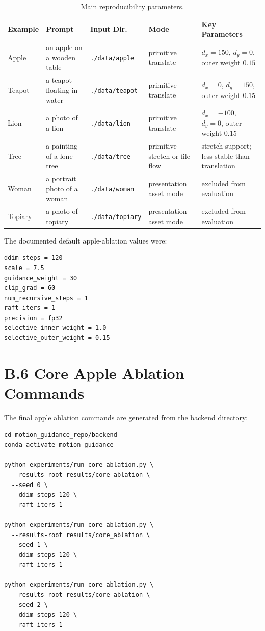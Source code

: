 \begin{table}[p]
  \centering
  \scriptsize
  \caption{Main reproducibility parameters.}
  \label{tab:appendix-repro-params}
  \renewcommand{\arraystretch}{1.15}
  \begin{tabular}{p{0.75in}|p{1.05in}|p{1.0in}|p{1.0in}|p{1.45in}}
    \hline
    \textbf{Example} & \textbf{Prompt} & \textbf{Input Dir.} & \textbf{Mode} & \textbf{Key Parameters} \\ \hline \hline
    Apple & an apple on a wooden table & \texttt{./data/apple} & primitive translate & $d_x=150$, $d_y=0$, outer weight $0.15$ \\ \hline
    Teapot & a teapot floating in water & \texttt{./data/teapot} & primitive translate & $d_x=0$, $d_y=150$, outer weight $0.15$ \\ \hline
    Lion & a photo of a lion & \texttt{./data/lion} & primitive translate & $d_x=-100$, $d_y=0$, outer weight $0.15$ \\ \hline
    Tree & a painting of a lone tree & \texttt{./data/tree} & primitive stretch or file flow & stretch support; less stable than translation \\ \hline
    Woman & a portrait photo of a woman & \texttt{./data/woman} & presentation asset mode & excluded from evaluation \\ \hline
    Topiary & a photo of topiary & \texttt{./data/topiary} & presentation asset mode & excluded from evaluation \\ \hline
  \end{tabular}
\end{table}

The documented default apple-ablation values were:

\begin{verbatim}
ddim_steps = 120
scale = 7.5
guidance_weight = 30
clip_grad = 60
num_recursive_steps = 1
raft_iters = 1
precision = fp32
selective_inner_weight = 1.0
selective_outer_weight = 0.15
\end{verbatim}

\section*{B.6 Core Apple Ablation Commands}

The final apple ablation commands are generated from the backend directory:

\begin{verbatim}
cd motion_guidance_repo/backend
conda activate motion_guidance

python experiments/run_core_ablation.py \
  --results-root results/core_ablation \
  --seed 0 \
  --ddim-steps 120 \
  --raft-iters 1

python experiments/run_core_ablation.py \
  --results-root results/core_ablation \
  --seed 1 \
  --ddim-steps 120 \
  --raft-iters 1

python experiments/run_core_ablation.py \
  --results-root results/core_ablation \
  --seed 2 \
  --ddim-steps 120 \
  --raft-iters 1
\end{verbatim}

